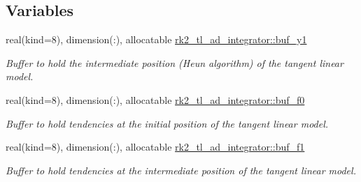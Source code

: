\subsection*{Variables}
\begin{DoxyCompactItemize}
\item 
real(kind=8), dimension(\+:), allocatable \hyperlink{namespacerk2__tl__ad__integrator_afacb3ff63a02a9f4db66699cdca4b05b}{rk2\+\_\+tl\+\_\+ad\+\_\+integrator\+::buf\+\_\+y1}
\begin{DoxyCompactList}\small\item\em Buffer to hold the intermediate position (Heun algorithm) of the tangent linear model. \end{DoxyCompactList}\item 
real(kind=8), dimension(\+:), allocatable \hyperlink{namespacerk2__tl__ad__integrator_ac7b0aea8c2a541e987047da9bc08ff61}{rk2\+\_\+tl\+\_\+ad\+\_\+integrator\+::buf\+\_\+f0}
\begin{DoxyCompactList}\small\item\em Buffer to hold tendencies at the initial position of the tangent linear model. \end{DoxyCompactList}\item 
real(kind=8), dimension(\+:), allocatable \hyperlink{namespacerk2__tl__ad__integrator_a72947f0ba4ce3b9e7877af0e9c4ba13e}{rk2\+\_\+tl\+\_\+ad\+\_\+integrator\+::buf\+\_\+f1}
\begin{DoxyCompactList}\small\item\em Buffer to hold tendencies at the intermediate position of the tangent linear model. \end{DoxyCompactList}\end{DoxyCompactItemize}
